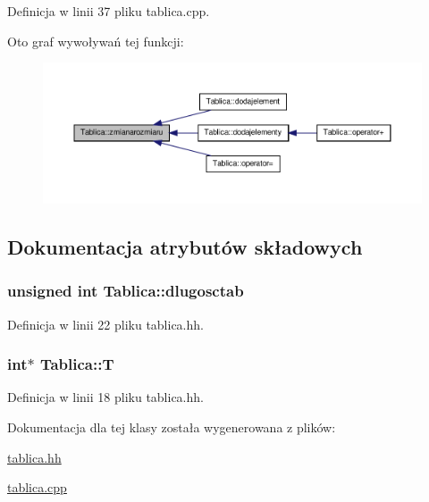 Definicja w linii 37 pliku tablica.\-cpp.



Oto graf wywoływań tej funkcji\-:\nopagebreak
\begin{figure}[H]
\begin{center}
\leavevmode
\includegraphics[width=350pt]{class_tablica_a4e743bdbb74647717d63015894dfae8d_icgraph}
\end{center}
\end{figure}




\subsection{Dokumentacja atrybutów składowych}
\hypertarget{class_tablica_ab6ba0fd6c21f6dc5564a8180b2d6bc69}{
\subsubsection[{dlugosctab}]{\setlength{\rightskip}{0pt plus 5cm}unsigned int Tablica\-::dlugosctab\hspace{0.3cm}{\ttfamily [private]}}}\label{class_tablica_ab6ba0fd6c21f6dc5564a8180b2d6bc69}


Definicja w linii 22 pliku tablica.\-hh.

\hypertarget{class_tablica_a0b8cd5b5744d8758471455946bc6c8ee}{
\subsubsection[{T}]{\setlength{\rightskip}{0pt plus 5cm}int$\ast$ Tablica\-::\-T\hspace{0.3cm}{\ttfamily [private]}}}\label{class_tablica_a0b8cd5b5744d8758471455946bc6c8ee}


Definicja w linii 18 pliku tablica.\-hh.



Dokumentacja dla tej klasy została wygenerowana z plików\-:\begin{DoxyCompactItemize}
\item 
\hyperlink{tablica_8hh}{tablica.\-hh}\item 
\hyperlink{tablica_8cpp}{tablica.\-cpp}\end{DoxyCompactItemize}
